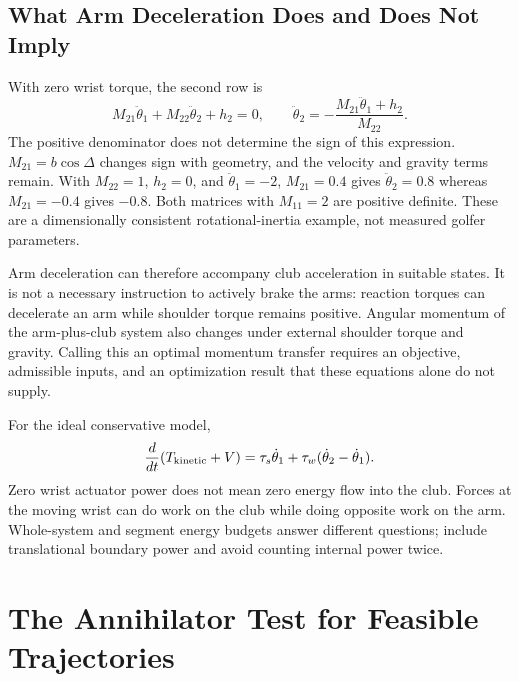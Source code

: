 \documentclass[12pt, openany]{book}
\theoremstyle{plain}
\begin{document}
\subsection{What Arm Deceleration Does and Does Not Imply}

With zero wrist torque, the second row is
\begin{equation}
M_{21}\ddot\theta_1+M_{22}\ddot\theta_2+h_2=0,
\qquad
\ddot\theta_2=-\frac{M_{21}\ddot\theta_1+h_2}{M_{22}}.
\label{eq:pend_unactuated}
\end{equation}
The positive denominator does not determine the sign of this expression.
$M_{21}=b\cos\Delta$ changes sign with geometry, and the velocity and gravity
terms remain. With $M_{22}=1$, $h_2=0$, and $\ddot\theta_1=-2$,
$M_{21}=0.4$ gives $\ddot\theta_2=0.8$ whereas $M_{21}=-0.4$ gives $-0.8$.
Both matrices with $M_{11}=2$ are positive definite. These are a dimensionally
consistent rotational-inertia example, not measured golfer parameters.

Arm deceleration can therefore accompany club acceleration in suitable states.
It is not a necessary instruction to actively brake the arms: reaction torques
can decelerate an arm while shoulder torque remains positive. Angular momentum
of the arm-plus-club system also changes under external shoulder torque and
gravity. Calling this an optimal momentum transfer requires an objective,
admissible inputs, and an optimization result that these equations alone do not supply.

For the ideal conservative model,
\begin{equation}
\frac{d}{dt}(T_{\rm kinetic}+V)
=\tau_s\dot\theta_1+\tau_w(\dot\theta_2-\dot\theta_1).
\end{equation}
Zero wrist actuator power does not mean zero energy flow into the club.
Forces at the moving wrist can do work on the club while doing opposite work
on the arm. Whole-system and segment energy budgets answer different questions;
include translational boundary power and avoid counting internal power twice.

\section{The Annihilator Test for Feasible Trajectories}
\end{document}
